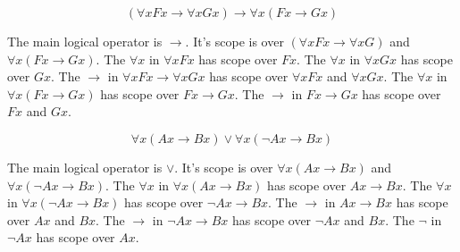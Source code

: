 \documentclass[12pt]{article}
\begin{document}
\[ (\forall x Fx \rightarrow \forall x Gx) \rightarrow \forall x (Fx \rightarrow Gx) \]

\begin{center}
\end{center}

The main logical operator is $\rightarrow$. It's scope is over $(\forall x Fx \rightarrow \forall x G)$ and $\forall x (Fx \rightarrow Gx)$.
The $\forall x$ in $\forall x Fx$ has scope over $Fx$.
The $\forall x$ in $\forall x Gx$ has scope over $Gx$.
The $\rightarrow$ in $\forall x Fx \rightarrow \forall x Gx$ has scope over $\forall x Fx$ and $\forall x Gx$.
The $\forall x$ in $\forall x (Fx \rightarrow Gx)$ has scope over $Fx \rightarrow Gx$.
The $\rightarrow$ in $Fx \rightarrow Gx$ has scope over $Fx$ and $Gx$.




\[ \forall x (Ax \rightarrow Bx) \lor \forall x( \neg Ax \rightarrow Bx) \]

\begin{center}
\end{center}

The main logical operator is $\lor$. It's scope is over $\forall x (Ax \rightarrow Bx)$ and $\forall x( \neg Ax \rightarrow Bx)$.
The $\forall x$ in $\forall x (Ax \rightarrow Bx)$ has scope over $Ax \rightarrow Bx$.
The $\forall x$ in $\forall x( \neg Ax \rightarrow Bx)$ has scope over $\neg Ax \rightarrow Bx$.
The $\rightarrow$ in $Ax \rightarrow Bx$ has scope over $Ax$ and $Bx$.
The $\rightarrow$ in $\neg Ax \rightarrow Bx$ has scope over $\neg Ax$ and $Bx$.
The $\neg$ in $\neg Ax$ has scope over $Ax$.
\end{document}
